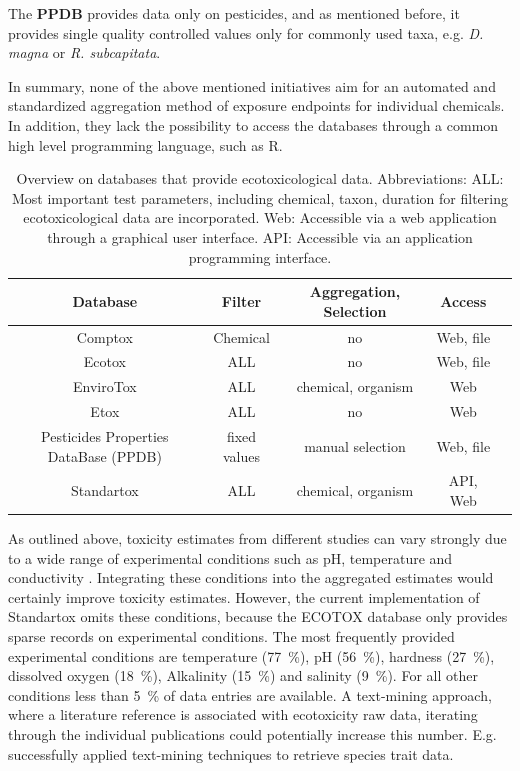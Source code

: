\documentclass[journal,datadescriptor,accept,moreauthors,pdftex]{Definitions/mdpi}
\begin{document}
\par
The \textbf{PPDB} provides data only on pesticides, and as mentioned before, it provides single quality controlled values only for commonly used taxa, e.g. \textit{D. magna} or \textit{R. subcapitata}.
\par
In summary, none of the above mentioned initiatives aim for an automated and standardized aggregation method of exposure endpoints for individual chemicals. In addition, they lack the possibility to access the databases through a common high level programming language, such as R.

\begin{table}[H]
    \caption{Overview on databases that provide ecotoxicological data. Abbreviations: ALL: Most important test parameters, including chemical, taxon, duration for filtering ecotoxicological data are incorporated. Web: Accessible via a web application through a graphical user interface. API: Accessible via an application programming interface.}
    \label{tab:database-differences}
    \centering
    \begin{tabular}{ccccc}
    \toprule
    \textbf{Database} & \textbf{Filter} & \textbf{Aggregation, Selection} & \textbf{Access} \\
    \midrule
    Comptox \citep{williams_comptox_2017} & Chemical & no & Web, file \\
    Ecotox \citep{usepa_ecotox_2019} & ALL & no & Web, file \\
    EnviroTox \citep{healthandenvironmentalsciencesinstitutehesi_envirotox_2019} & ALL & chemical, organism & Web \\
    Etox \citep{umweltbundesamt_etox_2019} & ALL & no & Web \\
    Pesticides Properties DataBase (PPDB) \citep{lewis_international_2016} & fixed values & manual selection & Web, file \\
    Standartox & ALL & chemical, organism & API, Web \\
    \bottomrule
\end{tabular}
\end{table}

\par
As outlined above, toxicity estimates from different studies can vary strongly due to a wide range of experimental conditions such as pH, temperature and conductivity \citep{rosenkrantz_influence_2013, li_temperature_2011}. Integrating these conditions into the aggregated estimates would certainly improve toxicity estimates. However, the current implementation of Standartox omits these conditions, because the ECOTOX database only provides sparse records on experimental conditions. The most frequently provided experimental conditions are temperature (77~\%), pH (56~\%), hardness (27~\%), dissolved oxygen (18~\%), Alkalinity (15~\%) and salinity (9~\%). For all other conditions less than 5~\% of data entries are available. A text-mining approach, where a literature reference is associated with ecotoxicity raw data, iterating through the individual publications could potentially increase this number. E.g. \citet{compson_linking_2018} successfully applied text-mining techniques to retrieve species trait data. 
\end{document}
